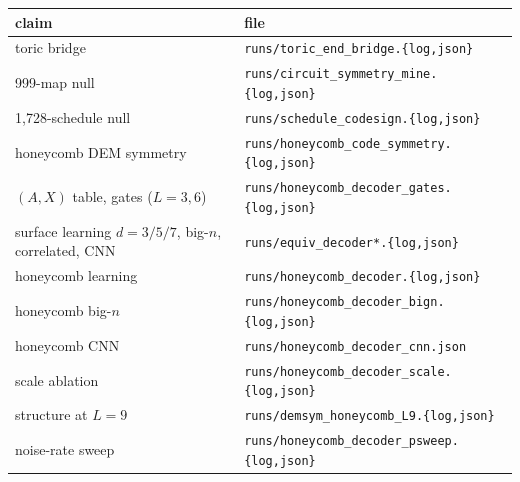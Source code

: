 \documentclass[11pt]{article}
\begin{document}
\begin{center}
\small
\begin{tabular}{ll}
\toprule
claim & file \\
\midrule
toric bridge & \texttt{runs/toric\_end\_bridge.\{log,json\}} \\
999-map null & \texttt{runs/circuit\_symmetry\_mine.\{log,json\}} \\
1{,}728-schedule null & \texttt{runs/schedule\_codesign.\{log,json\}} \\
honeycomb DEM symmetry & \texttt{runs/honeycomb\_code\_symmetry.\{log,json\}} \\
$(A,X)$ table, gates ($L=3,6$) & \texttt{runs/honeycomb\_decoder\_gates.\{log,json\}} \\
surface learning $d=3/5/7$, big-$n$, correlated, CNN & \texttt{runs/equiv\_decoder*.\{log,json\}} \\
honeycomb learning & \texttt{runs/honeycomb\_decoder.\{log,json\}} \\
honeycomb big-$n$ & \texttt{runs/honeycomb\_decoder\_bign.\{log,json\}} \\
honeycomb CNN & \texttt{runs/honeycomb\_decoder\_cnn.json} \\
scale ablation & \texttt{runs/honeycomb\_decoder\_scale.\{log,json\}} \\
structure at $L=9$ & \texttt{runs/demsym\_honeycomb\_L9.\{log,json\}} \\
noise-rate sweep & \texttt{runs/honeycomb\_decoder\_psweep.\{log,json\}} \\
\bottomrule
\end{tabular}
\end{center}
\end{document}
